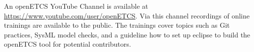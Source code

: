 An openETCS YouTube Channel is available at \url{https://www.youtube.com/user/openETCS}. Via this channel recordings of online trainings are available to the public. The trainings cover topics such as Git practices, SysML model checks, and a guideline how to set up eclipse to build the openETCS tool for potential contributors.




